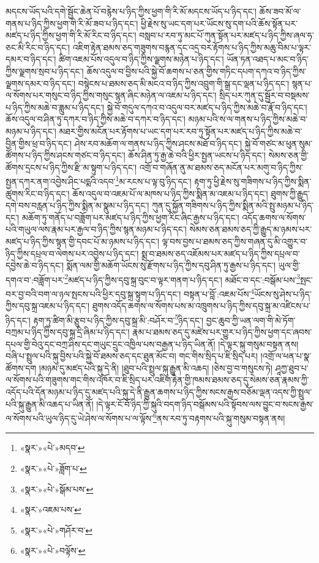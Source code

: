 མདངས་ཡོད་པའི་དགེ་སྦྱོང་ཆེན་པོ་བརྙེས་པ་ཉིད་ཀྱིས་ཕྱག་གི་རི་མོ་མདངས་ཡོད་པ་ཉིད་དང་། ཆོས་ཟབ་མོ་ལ་གནས་པ་ཉིད་ཀྱིས་ཕྱག་གི་རི་མོ་ཟབ་པ་ཉིད་དང་། ཕྱི་རྗེས་སུ་ཡང་དག་པར་ཡོངས་སུ་དག་པའི་ཆོས་སྟོན་པར་མཛད་པ་ཉིད་ཀྱིས་ཕྱག་གི་རི་མོ་རིང་བ་ཉིད་དང་། བསླབ་པ་རབ་ཏུ་མང་པོ་ཀུན་སྟོན་པར་མཛད་པ་ཉིད་ཀྱིས་ཞལ་ཧ་ཅང་མི་རིང་བ་ཉིད་དང་། འཇིག་རྟེན་ཐམས་ཅད་གཟུགས་བརྙན་དང་འདྲ་བར་རྟོགས་པ་ཉིད་ཀྱིས་མཆུ་བིམ་པ་ལྟར་དམར་བ་ཉིད་དང་། ཚིག་འཇམ་པོས་འདུལ་བ་ཉིད་ཀྱིས་ལྗགས་མཉེན་པ་ཉིད་དང་། ཡོན་ཏན་འཐད་པ་མང་བ་ཉིད་ཀྱིས་ལྗགས་སྲབ་པ་ཉིད་དང་། ཆོས་འདུལ་བ་བྱིས་པའི་སྐྱེ་བོ་ཆགས་པ་ཅན་གྱིས་གཏིང་དཔག་དཀའ་བ་ཉིད་ཀྱིས་ལྗགས་དམར་བ་ཉིད་དང་། བསྙེངས་པ་ཐམས་ཅད་མི་མངའ་བ་ཉིད་ཀྱིས་འབྲུག་གི་སྒྲ་དང་ལྡན་པ་ཉིད་དང་། སྙན་པ་ལ་སོགས་པར་གསུང་བ་ཉིད་ཀྱིས་གསུང་སྙན་ཞིང་མཉེན་ལ་འཇམ་པ་ཉིད་དང་། སྲིད་པར་ཀུན་དུ་སྦྱོར་བ་བསྡམས་པ་ཉིད་ཀྱིས་མཆེ་བ་ཟླུམ་པ་ཉིད་དང་། སྐྱེ་བོ་གདུལ་དཀའ་བ་འདུལ་བར་མཛད་པ་ཉིད་ཀྱིས་མཆེ་བ་རྣོ་བ་ཉིད་དང་། ཆོས་འདུལ་བ་ཤིན་ཏུ་དཀར་བ་ཉིད་ཀྱིས་མཆེ་བ་དཀར་བ་ཉིད་དང་། མཉམ་པའི་ས་ལ་གནས་པ་ཉིད་ཀྱིས་མཆེ་བ་མཉམ་པ་ཉིད་དང་། མཐར་གྱིས་མངོན་པར་རྟོགས་པ་ཡང་དག་པར་རབ་ཏུ་སྟོན་པར་མཛད་པ་ཉིད་ཀྱིས་མཆེ་བ་བྱིན་གྱིས་ཕྲ་བ་ཉིད་དང་། ཤེས་རབ་མཆོག་ལ་གནས་པ་ཉིད་ཀྱིས་ཤངས་མཐོ་བ་ཉིད་དང་། སྐྱེ་བོ་གཙང་མ་ཕུན་སུམ་ཚོགས་པ་ཉིད་ཀྱིས་ཤངས་གཙང་བ་ཉིད་དང་། ཆོས་ཤིན་ཏུ་རྒྱ་ཆེ་བའི་ཕྱིར་སྤྱན་ཡངས་པ་ཉིད་དང་། སེམས་ཅན་གྱི་ཚོགས་དྲངས་པ་ཉིད་ཀྱིས་རྫི་མ་སྟུག་པ་ཉིད་དང་། འགྲོ་བ་གཞོན་ནུ་མ་ཐམས་ཅད་མངོན་པར་མགུ་བ་ཉིད་ཀྱིས་སྤྱན་དཀར་ནག་འབྱེས་ཤིང་པདྨའི་འདབ་\footnote{«སྣར་»«པེ་»མདབ་}མ་རངས་པ་ལྟ་བུ་ཉིད་དང་། རྟག་ཏུ་ཕྱི་རྗེས་སུ་གཟིགས་པ་ཉིད་ཀྱིས་སྨིན་ཚུགས་རིང་བ་ཉིད་དང་། ཆོས་འདུལ་བ་འཇམ་པོ་ལ་མཁས་པ་ཉིད་ཀྱིས་སྨིན་མ་འཇམ་པ་ཉིད་དང་། ཐུགས་ཀྱི་རྒྱུད་དགེ་བས་བརླན་པ་ཉིད་ཀྱིས་སྨིན་མ་སྣུམ་པ་ཉིད་དང་། ཀུན་དུ་སྐྱོན་གཟིགས་པ་ཉིད་ཀྱིས་སྨིན་མའི་སྤུ་མཉམ་པ་ཉིད་དང་། མཆོག་ཏུ་གནོད་པ་བཟློག་པར་མཛད་པ་ཉིད་ཀྱིས་ཕྱག་རིང་ཞིང་རྒྱས་པ་ཉིད་དང་། འདོད་ཆགས་ལ་སོགས་པའི་གཡུལ་ལས་རྣམ་པར་རྒྱལ་བ་ཉིད་ཀྱིས་སྙན་མཉམ་པ་ཉིད་དང་། སེམས་ཅན་ཐམས་ཅད་ཀྱི་རྒྱུད་མ་ཉམས་པར་མཛད་པ་ཉིད་ཀྱིས་སྙན་གྱི་དབང་པོ་མ་ཉམས་པ་ཉིད་དང་། ལྟ་བས་བྱས་པ་ཐམས་ཅད་ཀྱིས་གཞན་དུ་མི་འགྱུར་བ་ཉིད་ཀྱིས་དཔྲལ་བ་ལེགས་པར་འབྱེས་པ་ཉིད་དང་། སྨྲ་བ་ཐམས་ཅད་འཇོམས་པར་མཛད་པ་ཉིད་ཀྱིས་དཔྲལ་བ་དབྱེས་ཆེ་བ་ཉིད་དང་། སྨོན་ལམ་གྱི་མཆོག་ཡོངས་སུ་རྫོགས་པ་ཉིད་ཀྱིས་དབུ་ཤིན་ཏུ་རྒྱས་པ་ཉིད་དང་། ཡུལ་གྱི་དགའ་བ་:བཟློག་པར་\footnote{«སྣར་»«པེ་»ཟློག་པ་}མཛད་པ་ཉིད་ཀྱིས་དབུ་སྐྲ་བུང་བ་ལྟར་གནག་པ་ཉིད་དང་། མཐོང་བ་དང་:བསྒོམ་པས་\footnote{«སྣར་»«པེ་»སྒོམ་པས་}སྤང་བར་བྱ་བའི་བག་ལ་ཉལ་སྤངས་པའི་ཕྱིར་དབུ་སྐྲ་སྟུག་པ་ཉིད་དང་། བསྟན་པ་བློ་:འཇམ་པོས་\footnote{«སྣར་»འཇམ་པས་}ཡོངས་སུ་ཤེས་པ་ཉིད་ཀྱིས་དབུ་སྐྲ་འཇམ་པ་ཉིད་དང་། ཐུགས་འདོད་ཆགས་ལ་སོགས་པས་མ་འཁྲུགས་པ་ཉིད་ཀྱིས་དབུ་སྐྲ་མ་འཛིངས་པ་ཉིད་དང་། རྟག་ཏུ་ཚིག་མི་རྩུབ་པ་ཉིད་ཀྱིས་དབུ་སྐྲ་མི་:བཤོར་བ་\footnote{«སྣར་»«པེ་»གཤོར་བ་}ཉིད་དང་། བྱང་ཆུབ་ཀྱི་ཡན་ལག་གི་མེ་ཏོག་བཀྲམ་པ་ཉིད་ཀྱིས་དབུ་སྐྲ་དྲི་ཞིམ་པ་ཉིད་དང་། རྣམ་པ་ཐམས་ཅད་དུ་མཛེས་པར་གྱུར་པ་ཉིད་ཀྱིས་ཕྱག་དང་ཞབས་དཔལ་གྱི་བེའུ་དང་བཀྲ་ཤིས་དང་གཡུང་དྲུང་འཁྱིལ་པས་བརྒྱན་པ་ཉིད་ཡིན་ནོ། །དེ་ལྟར་སྐུ་གསུམ་བསྟན་ནས། བཞི་པ་སྤྲུལ་པའི་སྐུ་བྱིས་པའི་སྐྱེ་བོ་ཐམས་ཅད་དང་ཐུན་མོང་བ། གང་གིས་སྲིད་པ་ཇི་སྲིད་པར། །འགྲོ་ལ་ཕན་པ་སྣ་ཚོགས་དག །མཉམ་དུ་མཛད་པའི་སྐུ་དེ་ནི། །ཐུབ་པའི་སྤྲུལ་སྐུ་རྒྱུན་མི་འཆད། །ཅེས་བྱ་བ་གསུངས་ཏེ། ཤཱཀྱ་ཐུབ་པ་ལ་སོགས་པའི་གཟུགས་གང་གིས་འཁོར་བ་ཇི་སྲིད་པར་འཇིག་རྟེན་གྱི་ཁམས་ཐམས་ཅད་དུ་སེམས་ཅན་རྣམས་ཀྱི་འདོད་པའི་དོན་མཉམ་པ་ཉིད་དུ་མཛད་པའི་སྐུ་དེ་ནི་རྒྱུན་ཆགས་པ་ཉིད་ཀྱིས་སངས་རྒྱས་བཅོམ་ལྡན་འདས་ཀྱི་སྤྲུལ་པའི་སྐུ་རྒྱུན་མི་འཆད་པ་ཡིན་ནོ། །དེ་ལྟར་ངོ་བོ་ཉིད་ཀྱི་སྐུའི་བདག་ཉིད་བསྒོམས་པའི་སྟོབས་ལས་བྱུང་བ་སངས་རྒྱས་ལ་སོགས་པའི་ཡུལ་ཉིད་དུ་ཡེ་ཤེས་ལ་སོགས་པ་ལ་ལྟོས་\footnote{«སྣར་»«པེ་»བལྟོས་}ནས་རབ་ཏུ་བརྟགས་པའི་སྐུ་གསུམ་བསྟན་ནས། 